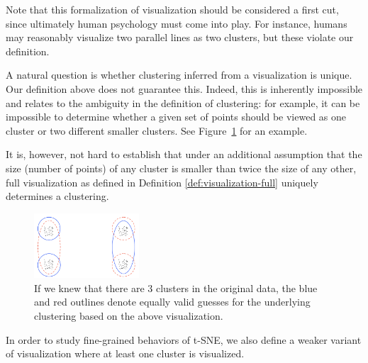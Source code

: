 \begin{remark*}
 Note that this formalization of visualization should be considered a first cut, since ultimately human psychology must come into play. For instance, humans may reasonably visualize two parallel lines as two clusters, but these violate our definition.

 A natural question is whether clustering inferred from a visualization is unique. Our definition above does not guarantee this. Indeed, this is inherently impossible and relates to the ambiguity in the definition of clustering: for example, it can be impossible to determine whether a given set of points should be viewed as one cluster or two different smaller clusters. See Figure~\ref{fig:unique-clustering} for an example.

It is, however, not hard to establish that under an additional assumption that the size (number of points) of any cluster is smaller than twice the size of any other, full visualization as defined in Definition \ref{def:visualization-full} uniquely determines a clustering.
\end{remark*}

\begin{figure}[htbp]
	\centering
	\includegraphics[width =0.35\textwidth]{unique_example.png}
	\vspace{10pt}
	\caption{If we knew that there are 3 clusters in the original data, the blue and red outlines denote equally valid guesses for the underlying clustering based on the above visualization.}%
	\label{fig:unique-clustering}%
\end{figure}


In order to study fine-grained behaviors of t-SNE, we also define a weaker variant of visualization where at least one cluster is visualized.%

